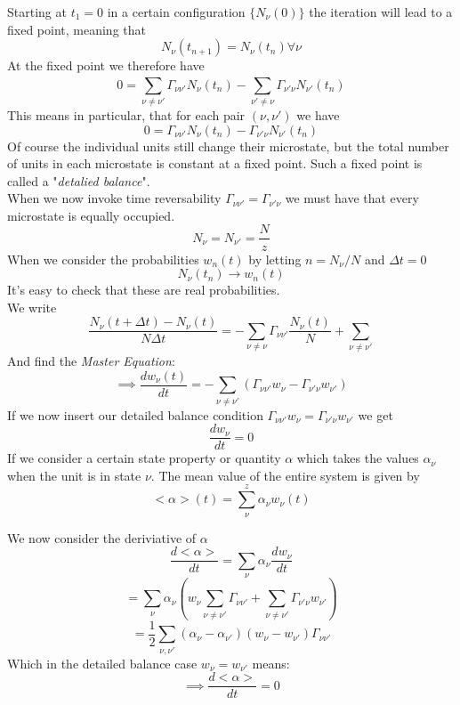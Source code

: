 \documentclass{report}
\begin{document}
Starting at $t_1=0$ in a certain configuration $\{N_\nu(0)\}$ the iteration will lead to a fixed point, meaning that \[
  N_\nu(t_{n+1}) = N_\nu\left( t_n \right)  \forall \nu
\] At the fixed point we therefore have \[
0 = \sum_{\nu \neq \nu'} \Gamma_{\nu \nu'} N_\nu(t_n) - \sum_{\nu' \neq \nu}^{} \Gamma_{\nu' \nu} N_{\nu'}(t_n)
\] 
This means in particular, that for each pair $\left( \nu, \nu' \right) $ we have \[
0 = \Gamma_{\nu \nu'} N_\nu(t_n) - \Gamma_{\nu' \nu} N_{\nu'}(t_n)
\] 
Of course the individual units still change their microstate, but the total number of units in each microstate is constant at a fixed point. Such a fixed point is called a "\emph{detalied balance}".\\
When we now invoke time reversability $\Gamma_{\nu \nu'} = \Gamma_{\nu' \nu}$ we must have that every microstate is equally occupied. \[
  N_\nu = N_{\nu'} = \frac{N}{z}
\] 
When we consider the probabilities $w_n(t)$ by letting $n = N_\nu / N$ and $\Delta t = 0$ \[
  N_\nu(t_n) \to w_n(t)
\] 
It's easy to check that these are real probabilities.\\
We write \[
\frac{N_\nu\left( t + \Delta t \right) - N_\nu(t)}{N \Delta t} = - \sum_{\nu \neq \nu}^{} \Gamma_{\nu \nu'} \frac{N_\nu(t)}{N} + \sum_{\nu \neq \nu'}^{} 
\] 
And find the \emph{Master Equation}:
\[
\implies \frac{dw_\nu(t)}{dt} = - \sum_{\nu \neq \nu'}^{} \left( \Gamma_{\nu \nu'} w_\nu - \Gamma_{\nu' \nu} w_{\nu'} \right) 
\] 
If we now insert our detailed balance condition $\Gamma_{\nu\nu'} w_\nu = \Gamma_{\nu'\nu} w_{\nu'}$ we get \[
\frac{dw_\nu}{dt} = 0
\] 
If we consider a certain state property or quantity $\alpha$ which takes the values $\alpha_\nu$ when the unit is in state $\nu$. The mean value of the entire system is given by \[
  <\alpha>\left(t  \right) = \sum_{\nu}^{z} \alpha_\nu w_\nu(t)
\]

We now consider the deriviative of $\alpha$ \[
\frac{d <\alpha>}{dt} = \sum_{\nu} \alpha_\nu \frac{dw_\nu}{dt} 
\] \[
= \sum_{\nu} \alpha_\nu \left( w_\nu \sum_{\nu \neq \nu'} \Gamma_{\nu\nu'} + \sum_{\nu \neq \nu'} \Gamma_{\nu'\nu} w_{\nu'}   \right) 
\] \[
= \frac{1}{2} \sum_{\nu, \nu'} \left( \alpha_\nu - \alpha_{\nu'} \right) \left( w_\nu - w_{\nu'} \right) \Gamma_{\nu \nu'} 
\] Which in the detailed balance case $w_\nu = w_{\nu'}$ means: \[
\implies \frac{d<\alpha>}{dt} = 0
\] 
\end{document}
